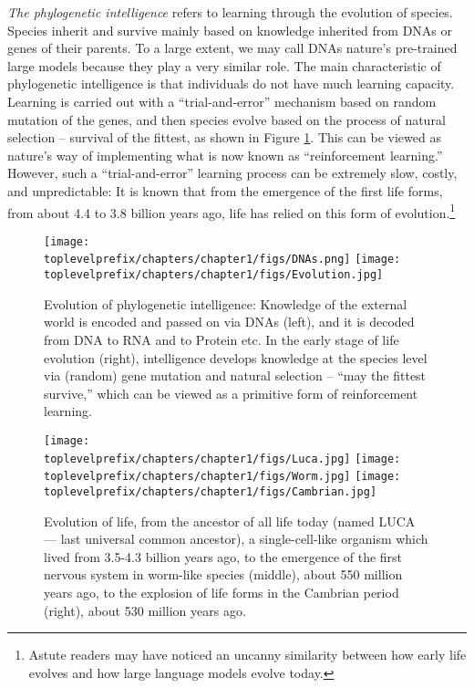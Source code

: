 \documentclass[../../book-main.tex]{subfiles}
\begin{document}
{\em The phylogenetic intelligence} refers to learning through the evolution of species. Species inherit and survive mainly based on knowledge inherited from DNAs or genes of their parents. To a large extent, we may call DNAs nature's pre-trained large models because they play a very similar role.  The main characteristic of phylogenetic intelligence is that individuals do not have much learning capacity. Learning is carried out with a ``trial-and-error'' mechanism based on random mutation of the genes, and then species evolve based on the process of natural selection -- survival of the fittest, as shown in Figure \ref{fig:phylogenetic}.
This can be viewed as nature's way of implementing what is now known as ``reinforcement learning.'' However, such a ``trial-and-error'' learning process can be extremely slow, costly, and unpredictable: It is known that from the emergence of the first life forms, from about 4.4 to 3.8 billion years ago, life has relied on this form of evolution.\footnote{Astute readers may have noticed an uncanny similarity between how early life evolves and how large language models evolve today.} 
\begin{figure}
    \centering
\texttt{[image: \\toplevelprefix/chapters/chapter1/figs/DNAs.png]}
\texttt{[image: \\toplevelprefix/chapters/chapter1/figs/Evolution.jpg]}
    \caption{Evolution of phylogenetic intelligence: Knowledge of the external world is encoded and passed on via DNAs (left), and it is decoded from DNA to RNA and to Protein etc. In the early stage of life evolution (right), intelligence develops knowledge at the species level via (random) gene mutation and natural selection -- ``may the fittest survive,'' which can be viewed as a primitive form of reinforcement learning.}
    \label{fig:phylogenetic}
\end{figure}
\begin{figure}
    \centering
\texttt{[image: \\toplevelprefix/chapters/chapter1/figs/Luca.jpg]}
\texttt{[image: \\toplevelprefix/chapters/chapter1/figs/Worm.jpg]}
\texttt{[image: \\toplevelprefix/chapters/chapter1/figs/Cambrian.jpg]}
    \caption{Evolution of life, from the ancestor of all life today (named LUCA --- last universal common ancestor), a single-cell-like organism which lived from 3.5-4.3 billion years ago, to the emergence of the first nervous system in worm-like species (middle), about 550 million years ago, to the explosion of life forms in the Cambrian period (right), about 530 million years ago.}
    \label{fig:evolution}
\end{figure}
\end{document}
